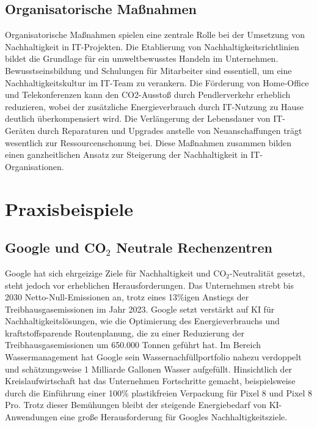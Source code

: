 \documentclass[12pt]{article}
\begin{document}
\subsection{Organisatorische Maßnahmen}
Organisatorische Maßnahmen spielen eine zentrale Rolle bei der Umsetzung von Nachhaltigkeit in IT-Projekten. Die Etablierung von Nachhaltigkeitsrichtlinien bildet die Grundlage für ein umweltbewusstes Handeln im Unternehmen\cite{murugesan2008}. Bewusstseinsbildung und Schulungen für Mitarbeiter sind essentiell, um eine Nachhaltigkeitskultur im IT-Team zu verankern\cite{jenkin2011}. Die Förderung von Home-Office und Telekonferenzen kann den CO2-Ausstoß durch Pendlerverkehr erheblich reduzieren, wobei der zusätzliche Energieverbrauch durch IT-Nutzung zu Hause deutlich überkompensiert wird\cite{tomlinson2010}. Die Verlängerung der Lebensdauer von IT-Geräten durch Reparaturen und Upgrades anstelle von Neuanschaffungen trägt wesentlich zur Ressourcenschonung bei\cite{baldé2017}. Diese Maßnahmen zusammen bilden einen ganzheitlichen Ansatz zur Steigerung der Nachhaltigkeit in IT-Organisationen.

\section{Praxisbeispiele}
\subsection{Google und CO$_2$ Neutrale Rechenzentren}
Google hat sich ehrgeizige Ziele für Nachhaltigkeit und CO$_2$-Neutralität gesetzt, steht jedoch vor erheblichen Herausforderungen. Das Unternehmen strebt bis 2030 Netto-Null-Emissionen an, trotz eines 13\%igen Anstiegs der Treibhausgasemissionen im Jahr 2023\cite{google2024}. Google setzt verstärkt auf KI für Nachhaltigkeitslösungen, wie die Optimierung des Energieverbrauchs und kraftstoffsparende Routenplanung, die zu einer Reduzierung der Treibhausgasemissionen um 650.000 Tonnen geführt hat\cite{google2024}. Im Bereich Wassermanagement hat Google sein Wassernachfüllportfolio nahezu verdoppelt und schätzungsweise 1 Milliarde Gallonen Wasser aufgefüllt\cite{google2024}. Hinsichtlich der Kreislaufwirtschaft hat das Unternehmen Fortschritte gemacht, beispielsweise durch die Einführung einer 100\% plastikfreien Verpackung für Pixel 8 und Pixel 8 Pro\cite{google2024}. Trotz dieser Bemühungen bleibt der steigende Energiebedarf von KI-Anwendungen eine große Herausforderung für Googles Nachhaltigkeitsziele.
\end{document}
